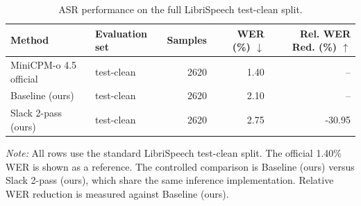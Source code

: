 \begin{table}[t]
\centering
\caption{ASR performance on the full LibriSpeech test-clean split.}
\label{tab:slack_asr}
\begin{tabular}{llrrr}
\toprule
Method & Evaluation set & Samples & WER (\%) $\downarrow$ & Rel. WER Red. (\%) $\uparrow$ \\
\midrule
MiniCPM-o 4.5 official & test-clean & 2620 & 1.40 & -- \\
Baseline (ours) & test-clean & 2620 & 2.10 & -- \\
Slack 2-pass (ours) & test-clean & 2620 & 2.75 & -30.95 \\
\bottomrule
\end{tabular}
\vspace{2pt}
\begin{minipage}{0.98\linewidth}
\footnotesize \textit{Note:} All rows use the standard LibriSpeech test-clean split. The official 1.40\% WER is shown as a reference. The controlled comparison is Baseline (ours) versus Slack 2-pass (ours), which share the same inference implementation. Relative WER reduction is measured against Baseline (ours).
\end{minipage}
\end{table}

